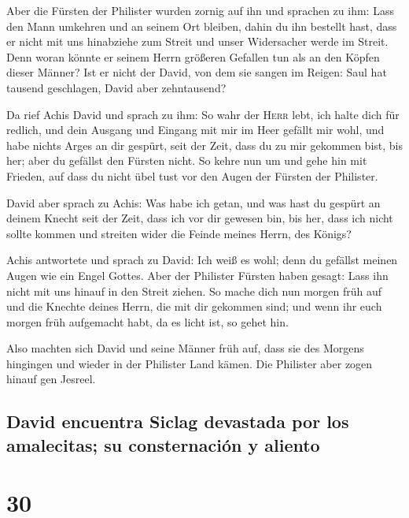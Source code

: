  Aber die Fürsten der Philister wurden zornig auf ihn und
sprachen zu ihm: Lass den Mann umkehren und an seinem Ort bleiben, dahin
du ihn bestellt hast, dass er nicht mit uns hinabziehe zum Streit und
unser Widersacher werde im Streit. Denn woran könnte er seinem Herrn
größeren Gefallen tun als an den Köpfen dieser Männer? 
Ist er nicht der David, von dem sie sangen im Reigen: Saul hat tausend
geschlagen, David aber zehntausend?

 Da rief Achis David und sprach zu ihm: So wahr der
\textsc{Herr} lebt, ich halte dich für redlich, und dein Ausgang und
Eingang mit mir im Heer gefällt mir wohl, und habe nichts Arges an dir
gespürt, seit der Zeit, dass du zu mir gekommen bist, bis her; aber du
gefällst den Fürsten nicht.  So kehre nun um und gehe hin
mit Frieden, auf dass du nicht übel tust vor den Augen der Fürsten der
Philister.

 David aber sprach zu Achis: Was habe ich getan, und was
hast du gespürt an deinem Knecht seit der Zeit, dass ich vor dir gewesen
bin, bis her, dass ich nicht sollte kommen und streiten wider die Feinde
meines Herrn, des Königs?

 Achis antwortete und sprach zu David: Ich weiß es wohl;
denn du gefällst meinen Augen wie ein Engel Gottes. Aber der Philister
Fürsten haben gesagt: Lass ihn nicht mit uns hinauf in den Streit
ziehen.  So mache dich nun morgen früh auf und die
Knechte deines Herrn, die mit dir gekommen sind; und wenn ihr euch
morgen früh aufgemacht habt, da es licht ist, so gehet hin.

 Also machten sich David und seine Männer früh auf, dass
sie des Morgens hingingen und wieder in der Philister Land kämen. Die
Philister aber zogen hinauf gen Jesreel.

\hypertarget{david-encuentra-siclag-devastada-por-los-amalecitas-su-consternaciuxf3n-y-aliento}{%
\subsection{David encuentra Siclag devastada por los amalecitas; su
consternación y
aliento}\label{david-encuentra-siclag-devastada-por-los-amalecitas-su-consternaciuxf3n-y-aliento}}

\hypertarget{section-29}{%
\section{30}\label{section-29}}

